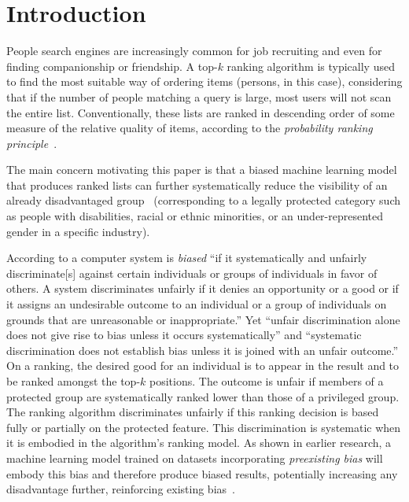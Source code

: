 \section{Introduction}\label{sec:introduction}

People search engines are increasingly common for job recruiting and even for finding companionship or friendship.
%
A top-$k$ ranking algorithm is typically used to find the most suitable way of ordering items (persons, in this case), considering that if the number of people matching a query is large, most users will not scan the entire list.
%
Conventionally, these lists are ranked in descending order of some measure of the relative quality of items, according to the \emph{probability ranking principle}~\cite{robertson1977probability}.

The main concern motivating this paper is that a biased machine learning model that produces ranked lists can further systematically reduce the visibility of an already disadvantaged group~\cite{peder2008,Dwork2012} (corresponding to a legally protected category such as people with disabilities, racial or ethnic minorities, or an under-represented gender in a specific industry).

According to \cite{friedman1996bias} a computer system is \emph{biased} ``if it systematically and unfairly discriminate[s] against certain individuals or groups of individuals in favor of others. A system discriminates unfairly if it denies an opportunity or a good or if it assigns an undesirable outcome to an individual or a group of individuals on grounds that are unreasonable or inappropriate.''
%
Yet ``unfair discrimination alone does not give rise to bias unless it occurs systematically'' and ``systematic discrimination does not establish bias unless it is joined with an unfair outcome.''
%
On a ranking, the desired good for an individual is to appear in the result and to be ranked amongst the top-$k$ positions. The outcome is unfair if members of a protected group are systematically ranked lower than those of a privileged group.
%
The ranking algorithm discriminates unfairly if this ranking decision is based fully or partially on the protected feature. This discrimination is systematic when it is embodied in the algorithm's ranking model. As shown in earlier research, a machine learning model trained on datasets incorporating \textit{preexisting bias} will embody this bias and therefore produce biased results, potentially increasing any disadvantage further, reinforcing existing bias~\cite{oneil2016weapons}.

